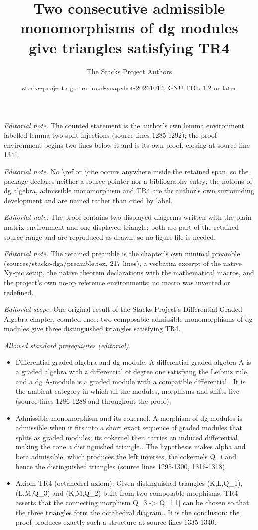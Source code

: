 \documentclass{stacks-project}
\title{Two consecutive admissible monomorphisms of dg modules give triangles satisfying TR4}
\author{The Stacks Project Authors}
\date{stacks-project:dga.tex:local-snapshot-20261012; GNU FDL 1.2 or later}
\theoremstyle{plain}
\theoremstyle{definition}
\theoremstyle{remark}
\numberwithin{equation}{subsection}
\begin{document}
\maketitle
\noindent\textit{Editorial note.} The counted statement is the author's own lemma environment labelled lemma-two-split-injections (source lines 1285-1292); the proof environment begins two lines below it and is its own proof, closing at source line 1341.\par\medskip
\noindent\textit{Editorial note.} No \textbackslash{}ref or \textbackslash{}cite occurs anywhere inside the retained span, so the package declares neither a source pointer nor a bibliography entry; the notions of dg algebra, admissible monomorphism and TR4 are the author's own surrounding development and are named rather than cited by label.\par\medskip
\noindent\textit{Editorial note.} The proof contains two displayed diagrams written with the plain matrix environment and one displayed triangle; both are part of the retained source range and are reproduced as drawn, so no figure file is needed.\par\medskip
\noindent\textit{Editorial note.} The retained preamble is the chapter's own minimal preamble (sources/stacks-dga/preamble.tex, 217 lines), a verbatim excerpt of the native Xy-pic setup, the native theorem declarations with the mathematical macros, and the project's own no-op reference environments; no macro was invented or redefined.\par\medskip
\noindent\textit{Editorial scope.} One original result of the Stacks Project's Differential Graded Algebra chapter, counted once: two composable admissible monomorphisms of dg modules give three distinguished triangles satisfying TR4.\par\medskip
\noindent\textit{Allowed standard prerequisites (editorial).}\begin{itemize}
\item Differential graded algebra and dg module. A differential graded algebra A is a graded algebra with a differential of degree one satisfying the Leibniz rule, and a dg A-module is a graded module with a compatible differential.. It is the ambient category in which all the modules, morphisms and shifts live (source lines 1286-1288 and throughout the proof).
\item Admissible monomorphism and its cokernel. A morphism of dg modules is admissible when it fits into a short exact sequence of graded modules that splits as graded modules; its cokernel then carries an induced differential making the cone a distinguished triangle.. The hypothesis makes alpha and beta admissible, which produces the left inverses, the cokernels Q\_i and hence the distinguished triangles (source lines 1295-1300, 1316-1318).
\item Axiom TR4 (octahedral axiom). Given distinguished triangles (K,L,Q\_1), (L,M,Q\_3) and (K,M,Q\_2) built from two composable morphisms, TR4 asserts that the connecting morphism Q\_3 -> Q\_1[1] can be chosen so that the three triangles form the octahedral diagram.. It is the conclusion: the proof produces exactly such a structure at source lines 1335-1340.
\end{itemize}\medskip
\end{document}

